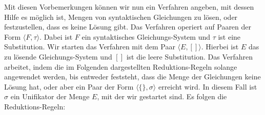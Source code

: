 Mit diesen Vorbemerkungen können wir nun ein Verfahren angeben, mit dessen Hilfe es
möglich ist, Mengen von syntaktischen Gleichungen zu lösen, oder festzustellen, dass es
keine Lösung gibt.  Das Verfahren operiert auf Paaren der Form 
$\langle F, \tau \rangle$.  Dabei ist $F$ ein syntaktisches Gleichungs-System und
$\tau$ ist eine Substitution.  Wir starten das Verfahren mit dem Paar 
$\langle E, [] \rangle$. Hierbei ist $E$ das zu lösende Gleichungs-System und $[]$ ist die leere Substitution.
Das Verfahren arbeitet, indem die im Folgenden
dargestellten Reduktions-Regeln solange angewendet werden, bis entweder feststeht, dass
die Menge der Gleichungen keine Lösung hat, oder aber ein Paar der Form 
$\langle \{\}, \sigma \rangle$ erreicht wird.  In diesem Fall ist $\sigma$ ein
Unifikator der Menge $E$, mit der wir gestartet sind.  Es folgen die Reduktions-Regeln:
